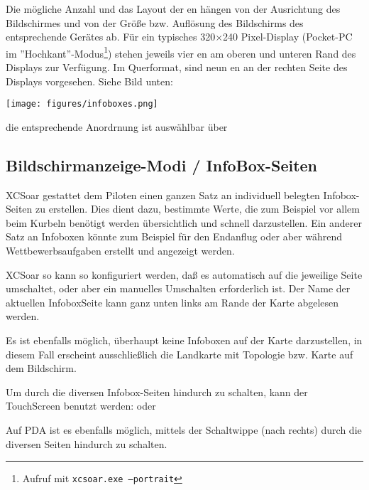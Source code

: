 Die mögliche Anzahl und das Layout der {\InfoBox}en  hängen von der Ausrichtung des Bildschirmes und von der Größe bzw. Auflösung des Bildschirms des entsprechende Gerätes ab. Für ein typisches 320$\times$240 Pixel-Display (Pocket-\textsf{PC} im ''Hochkant''-Modus\footnote{Aufruf mit \texttt{xcsoar.exe --portrait}}) stehen jeweils vier {\InfoBox}en am oberen und unteren Rand des Displays zur Verfügung.
Im Querformat, sind neun {\InfoBox}en an der rechten Seite des Displays vorgesehen. Siehe Bild unten:
\begin{center}
\texttt{[image: figures/infoboxes.png]}
\end{center}
die entsprechende Anordrnung ist auswählbar über
 \blink~

\subsection*{Bildschirmanzeige-Modi / InfoBox-Seiten}

\textsf{XCSoar} gestattet dem Piloten einen ganzen Satz an individuell belegten Infobox-Seiten zu erstellen.
Dies dient dazu, bestimmte Werte, die zum Beispiel vor allem beim Kurbeln  benötigt werden übersichtlich und schnell darzustellen.
Ein anderer Satz an Infoboxen könnte zum Beispiel für den Endanflug oder aber während Wettbewerbsaufgaben erstellt und angezeigt werden.

\textsf{XCSoar} so kann so konfiguriert werden, daß es automatisch auf die jeweilige Seite umschaltet, oder aber ein manuelles Umschalten erforderlich ist. Der Name der aktuellen InfoboxSeite kann ganz unten links am Rande der Karte abgelesen werden.

Es ist ebenfalls möglich, überhaupt keine Infoboxen auf der Karte darzustellen, in diesem Fall erscheint ausschließlich die Landkarte mit Topologie bzw. Karte auf dem Bildschirm.

Um durch die diversen Infobox-Seiten hindurch zu schalten, kann der TouchScreen benutzt werden:
 oder 

Auf PDA ist es ebenfalls möglich,  mittels der Schaltwippe  (nach rechts) durch die diversen Seiten hindurch zu schalten.

